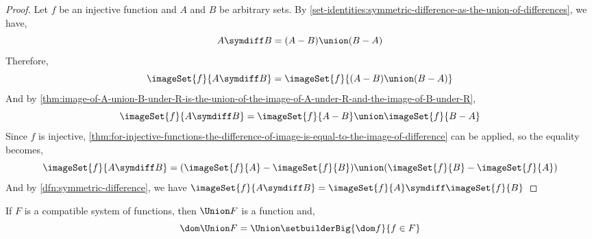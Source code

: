 \begin{proof}
    Let \( f \) be an injective function and \( A \) and \( B \) be arbitrary sets. By
    \cref{set-identities:symmetric-difference-as-the-union-of-differences}, we have,
    \begin{equation*}
        A \symdiff B = \mleft( A - B \mright) \union \mleft( B - A \mright)
    \end{equation*}
    Therefore,
    \begin{equation*}
        \imageSet{f}{A \symdiff B} = \imageSet{f}{\mleft( A - B \mright) \union \mleft( B - A \mright)}
    \end{equation*}
    And by \cref{thm:image-of-A-union-B-under-R-is-the-union-of-the-image-of-A-under-R-and-the-image-of-B-under-R},
    \begin{equation*}
        \imageSet{f}{A \symdiff B} = \imageSet{f}{A - B} \union \imageSet{f}{B - A}
    \end{equation*}
    Since \( f \) is injective, \cref{thm:for-injective-functions-the-difference-of-image-is-equal-to-the-image-of-difference}
    can be applied, so the equality becomes,
    \begin{equation*}
        \imageSet{f}{A \symdiff B} = \mleft( \imageSet{f}{A} - \imageSet{f}{B} \mright) \union \mleft( \imageSet{f}{B} - \imageSet{f}{A} \mright)
    \end{equation*}
    And by \cref{dfn:symmetric-difference}, we have \( \imageSet{f}{A \symdiff B} = \imageSet{f}{A} \symdiff \imageSet{f}{B} \)
\end{proof}

\begin{thm}
    \label{thm:the-union-of-a-compatible-system-of-functions-is-a-function}
    If \( F \) is a compatible system of functions, then \( \Union F \) is a function and,
    \begin{equation*}
        \dom \Union F = \Union \setbuilderBig{\dom f}{f \in F}
    \end{equation*}
\end{thm}

